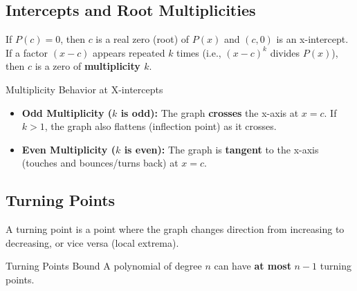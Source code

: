 \subsection{Intercepts and Root Multiplicities}

If $P(c) = 0$, then $c$ is a real zero (root) of $P(x)$ and $(c, 0)$ is an x-intercept.
If a factor $(x - c)$ appears repeated $k$ times (i.e., $(x - c)^k$ divides $P(x)$), then $c$ is a zero of \textbf{multiplicity $k$}.

\begin{definitionbox}{Multiplicity Behavior at X-intercepts}
\begin{itemize}
    \item \textbf{Odd Multiplicity ($k$ is odd):} The graph \textbf{crosses} the x-axis at $x = c$. If $k > 1$, the graph also flattens (inflection point) as it crosses.
    \item \textbf{Even Multiplicity ($k$ is even):} The graph is \textbf{tangent} to the x-axis (touches and bounces/turns back) at $x = c$.
\end{itemize}
\end{definitionbox}

\subsection{Turning Points}

A turning point is a point where the graph changes direction from increasing to decreasing, or vice versa (local extrema).
\begin{theorembox}{Turning Points Bound}
A polynomial of degree $n$ can have \textbf{at most} $n - 1$ turning points.
\end{theorembox}

